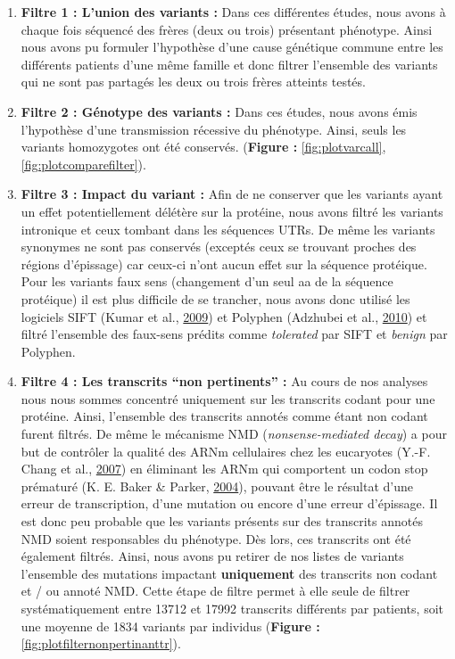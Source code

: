 \documentclass[12pt,twoside]{reedthesis}
\providecommand{\tightlist}{%
  \setlength{\itemsep}{0pt}\setlength{\parskip}{0pt}}
\theoremstyle{definition}
\theoremstyle{definition}
\theoremstyle{remark}
\begin{document}
  \begin{enumerate}
  \def\labelenumi{\arabic{enumi}.}
  \tightlist
  \item
    \textbf{Filtre 1 : L'union des variants :} Dans ces différentes
    études, nous avons à chaque fois séquencé des frères (deux ou trois)
    présentant phénotype. Ainsi nous avons pu formuler l'hypothèse d'une
    cause génétique commune entre les différents patients d'une même
    famille et donc filtrer l'ensemble des variants qui ne sont pas
    partagés les deux ou trois frères atteints testés.\\
  \item
    \textbf{Filtre 2 : Génotype des variants :} Dans ces études, nous
    avons émis l'hypothèse d'une transmission récessive du phénotype.
    Ainsi, seuls les variants homozygotes ont été conservés.
    (\textbf{Figure : }\ref{fig:plotvarcall},
    \ref{fig:plotcomparefilter}).\\
  \item
    \textbf{Filtre 3 : Impact du variant :} Afin de ne conserver que les
    variants ayant un effet potentiellement délétère sur la protéine, nous
    avons filtré les variants intronique et ceux tombant dans les
    séquences UTRs. De même les variants synonymes ne sont pas conservés
    (exceptés ceux se trouvant proches des régions d'épissage) car ceux-ci
    n'ont aucun effet sur la séquence protéique. Pour les variants faux
    sens (changement d'un seul aa de la séquence protéique) il est plus
    difficile de se trancher, nous avons donc utilisé les logiciels SIFT
    (Kumar et al., \protect\hyperlink{ref-Kumar2009}{2009}) et Polyphen
    (Adzhubei et al., \protect\hyperlink{ref-Adzhubei2010}{2010}) et
    filtré l'ensemble des faux-sens prédits comme \emph{tolerated} par
    SIFT et \emph{benign} par Polyphen.\\
  \item
    \textbf{Filtre 4 : Les transcrits ``non pertinents'' :} Au cours de
    nos analyses nous nous sommes concentré uniquement sur les transcrits
    codant pour une protéine. Ainsi, l'ensemble des transcrits annotés
    comme étant non codant furent filtrés. De même le mécanisme NMD
    (\emph{nonsense-mediated decay}) a pour but de contrôler la qualité
    des ARNm cellulaires chez les eucaryotes (Y.-F. Chang et al.,
    \protect\hyperlink{ref-Chang2007}{2007}) en éliminant les ARNm qui
    comportent un codon stop prématuré (K. E. Baker \& Parker,
    \protect\hyperlink{ref-Baker2004}{2004}), pouvant être le résultat
    d'une erreur de transcription, d'une mutation ou encore d'une erreur
    d'épissage. Il est donc peu probable que les variants présents sur des
    transcrits annotés NMD soient responsables du phénotype. Dès lors, ces
    transcrits ont été également filtrés. Ainsi, nous avons pu retirer de
    nos listes de variants l'ensemble des mutations impactant
    \textbf{uniquement} des transcrits non codant et / ou annoté NMD.
    Cette étape de filtre permet à elle seule de filtrer systématiquement
    entre 13712 et 17992 transcrits différents par patients, soit une
    moyenne de 1834 variants par individus (\textbf{Figure :
    }\ref{fig:plotfilternonpertinanttr}).
  \end{enumerate}
  
\end{document}
